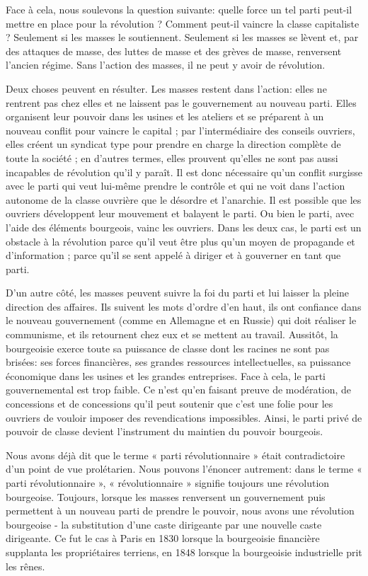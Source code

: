 Face à cela, nous soulevons la question suivante: quelle force un tel parti peut-il mettre en place pour la révolution ? Comment peut-il vaincre la classe capitaliste ? Seulement si les masses le soutiennent. Seulement si les masses se lèvent et, par des attaques de masse, des luttes de masse et des grèves de masse, renversent l'ancien régime. Sans l'action des masses, il ne peut y avoir de révolution.

Deux choses peuvent en résulter. Les masses restent dans l'action: elles ne rentrent pas chez elles et ne laissent pas le gouvernement au nouveau parti. Elles organisent leur pouvoir dans les usines et les ateliers et se préparent à un nouveau conflit pour vaincre le capital ; par l'intermédiaire des conseils ouvriers, elles créent un syndicat type pour prendre en charge la direction complète de toute la société ; en d'autres termes, elles prouvent qu'elles ne sont pas aussi incapables de révolution qu'il y paraît. Il est donc nécessaire qu'un conflit surgisse avec le parti qui veut lui-même prendre le contrôle et qui ne voit dans l'action autonome de la classe ouvrière que le désordre et l'anarchie. Il est possible que les ouvriers développent leur mouvement et balayent le parti. Ou bien le parti, avec l'aide des éléments bourgeois, vainc les ouvriers. Dans les deux cas, le parti est un obstacle à la révolution parce qu'il veut être plus qu'un moyen de propagande et d'information ; parce qu'il se sent appelé à diriger et à gouverner en tant que parti.

D'un autre côté, les masses peuvent suivre la foi du parti et lui laisser la pleine direction des affaires. Ils suivent les mots d’ordre d’en haut, ils ont confiance dans le nouveau gouvernement (comme en Allemagne et en Russie) qui doit réaliser le communisme, et ils retournent chez eux et se mettent au travail. Aussitôt, la bourgeoisie exerce toute sa puissance de classe dont les racines ne sont pas brisées: ses forces financières, ses grandes ressources intellectuelles, sa puissance économique dans les usines et les grandes entreprises. Face à cela, le parti gouvernemental est trop faible. Ce n’est qu’en faisant preuve de modération, de concessions et de concessions qu’il peut soutenir que c’est une folie pour les ouvriers de vouloir imposer des revendications impossibles. Ainsi, le parti privé de pouvoir de classe devient l’instrument du maintien du pouvoir bourgeois.

Nous avons déjà dit que le terme « parti révolutionnaire » était contradictoire d'un point de vue prolétarien. Nous pouvons l'énoncer autrement: dans le terme « parti révolutionnaire », « révolutionnaire » signifie toujours une révolution bourgeoise. Toujours, lorsque les masses renversent un gouvernement puis permettent à un nouveau parti de prendre le pouvoir, nous avons une révolution bourgeoise - la substitution d'une caste dirigeante par une nouvelle caste dirigeante. Ce fut le cas à Paris en 1830 lorsque la bourgeoisie financière supplanta les propriétaires terriens, en 1848 lorsque la bourgeoisie industrielle prit les rênes.

